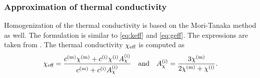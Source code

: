 \subsubsection{Approximation of thermal conductivity}\label{ssec:thermalconductivity}
Homogenization of the thermal conductivity is based on the Mori-Tanaka method as well.
The formulation is similar to \eqref{eq:keff} and \eqref{eq:geff}.
The expressions are taken from \cite{str_2011_mbeo}.
The thermal conductivity $\chi_{\text{eff}}$ is computed as
\begin{align}
	\chi_{\text{eff}} = \dfrac{c^{(\text{m})}\chi^{(\text{m})} + c^{(\text{i})} \chi^{(\text{i})} A_{\chi}^{(\text{i})}}{c^{(\text{m})} +  c^{(\text{i})} A_{\chi}^{(\text{i})}}\quad\text{and}\quad
	A_{\chi}^{(\text{i})} = \frac{3\chi^{(\text{m})}}{2\chi^{(\text{m})}+\chi^{(\text{i})}}.
\end{align}
